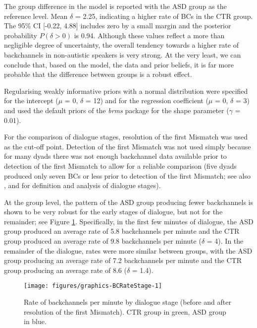 The group difference in the model is reported with the ASD group as the reference level. Mean \(\delta\) = 2.25, indicating a higher rate of BCs in the CTR group. The 95\% CI {[}-0.22, 4.88{]} includes zero by a small margin and the posterior probability \(P(\delta > 0)\) is 0.94. Although these values reflect a more than negligible degree of uncertainty, the overall tendency towards a higher rate of backchannels in non-autistic speakers is very strong. At the very least, we can conclude that, based on the model, the data and prior beliefs, it is far more probable that the difference between groups is a robust effect.

Regularising weakly informative priors with a normal distribution were specified for the intercept (\(\mu\) = 0, \(\delta\) = 12) and for the regression coefficient (\(\mu\) = 0, \(\delta\) = 3) and used the default priors of the \emph{brms} package for the shape parameter (\(\gamma\) = 0.01).

\label{BCFP_BC_results_BCRate_Stage}

For the comparison of dialogue stages, resolution of the first Mismatch was used as the cut-off point. Detection of the first Mismatch was not used simply because for many dyads there was not enough backchannel data available prior to detection of the first Mismatch to allow for a reliable comparison (five dyads produced only seven BCs or less prior to detection of the first Mismatch; see also ,  and  for definition and analysis of dialogue stages).

At the group level, the pattern of the ASD group producing fewer backchannels is shown to be very robust for the early stages of dialogue, but not for the remainder; see Figure \ref{fig:BCRateStage}. Specifically, in the first few minutes of dialogue, the ASD group produced an average rate of 5.8 backchannels per minute and the CTR group produced an average rate of 9.8 backchannels per minute (\(\delta\) = 4). In the remainder of the dialogue, rates were more similar between groups, with the ASD group producing an average rate of 7.2 backchannels per minute and the CTR group producing an average rate of 8.6 (\(\delta\) = 1.4).



\begin{figure}

{\texttt{[image: figures/graphics-BCRateStage-1]}
	
}

\caption{Rate of backchannels per minute by dialogue stage (before and after resolution of the first Mismatch). CTR group in green, ASD group in blue.}\label{fig:BCRateStage}
\end{figure}


